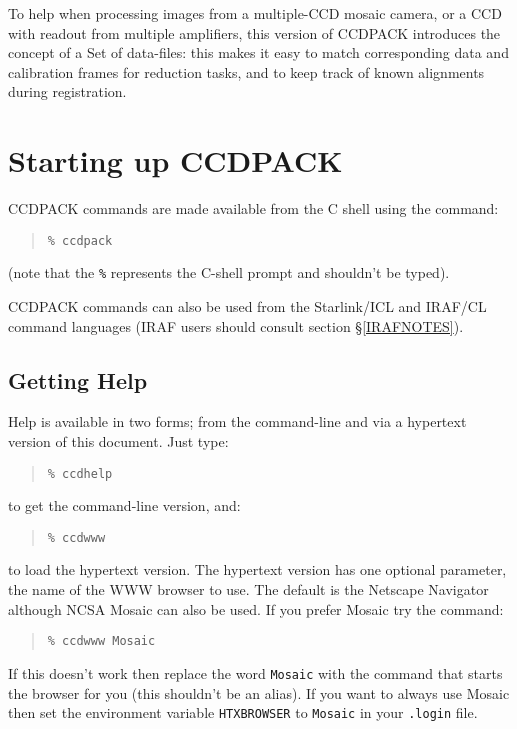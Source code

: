 \documentclass[twoside,11pt]{article}
\newcommand{\htmladdnormallink}[2]{#1}
\newcommand{\xref}[3]{#1}
\newcommand{\xlabel}[1]{}
\renewcommand{\_}{\texttt{\symbol{95}}}
\newenvironment{myquote}{\begin{quote}\begin{small}}{\end{small}\end{quote}}
\newcommand{\text}[1]{{\small \tt #1}}
\begin{document}
To help when processing images from a multiple-CCD mosaic camera,
or a CCD with readout from multiple amplifiers,
this version of CCDPACK introduces the concept of a
Set of data-files: this makes it easy to match
corresponding data and calibration frames for reduction tasks,
and to keep track of known alignments during registration.
\section{\xlabel{startup}Starting up CCDPACK}

CCDPACK commands are made available from the C shell using the command:
\begin{myquote}
\begin{verbatim}
% ccdpack
\end{verbatim}
\end{myquote}
(note that the \text{\%} represents the C-shell prompt and shouldn't be typed).

CCDPACK commands can also be used from the Starlink/\xref{ICL}{sg5}{}
and IRAF/CL command languages (IRAF users should consult section
\S\ref{IRAFNOTES}).

\subsection{\xlabel{gettinghelp}Getting Help}

Help is available in two forms; from the command-line and via a
hypertext version of this document.
Just type:
\begin{myquote}
\begin{verbatim}
% ccdhelp
\end{verbatim}
\end{myquote}
to get the command-line version, and:
\begin{myquote}
\begin{verbatim}
% ccdwww
\end{verbatim}
\end{myquote}
to load the hypertext version. The hypertext version has one optional
parameter, the name of the WWW browser to use. The default is
\htmladdnormallink{the Netscape Navigator}{http://home.netscape.com/}
although
\htmladdnormallink{NCSA Mosaic}
{http://www.ncsa.uiuc.edu/SDG/Software/Mosaic/Docs/help-about.html}
can also be used. If you prefer Mosaic try the command:
\begin{myquote}
\begin{verbatim}
% ccdwww Mosaic
\end{verbatim}
\end{myquote}
If this doesn't work then replace the word \text{Mosaic} with the
command that starts the browser for you (this shouldn't be an alias).
If you want to always use Mosaic then set the environment variable
\text{HTX\_BROWSER} to \text{Mosaic} in your \text{.login} file.
\end{document}
